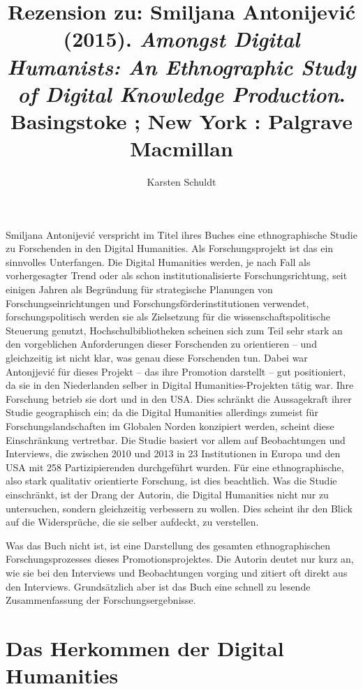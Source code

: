\documentclass[a4paper,
fontsize=11pt,
oneside,
numbers=noperiodatend,
parskip=half-,
bibliography=totoc,
final
]{scrartcl}
\title{\LARGE{Rezension zu: Smiljana Antonijević (2015). \emph{Amongst Digital Humanists: An Ethnographic Study of Digital Knowledge Production}. Basingstoke ; New York : Palgrave Macmillan}} %
\author{Karsten Schuldt} %
\date{}
\begin{document}
\maketitle
\thispagestyle{fancyplain} 


Smiljana Antonijević verspricht im Titel ihres Buches eine
ethnographische Studie zu Forschenden in den Digital Humanities. Als
Forschungsprojekt ist das ein sinnvolles Unterfangen. Die Digital
Humanities werden, je nach Fall als vorhergesagter Trend oder als schon
institutionalisierte Forschungsrichtung, seit einigen Jahren als
Begründung für strategische Planungen von Forschungseinrichtungen und
Forschungsförderinstitutionen verwendet, forschungspolitisch werden sie
als Zielsetzung für die wissenschaftspolitische Steuerung genutzt,
Hochschulbibliotheken scheinen sich zum Teil sehr stark an den
vorgeblichen Anforderungen dieser Forschenden zu orientieren -- und
gleichzeitig ist nicht klar, was genau diese Forschenden tun. Dabei war
Antonjjević für dieses Projekt -- das ihre Promotion darstellt -- gut
positioniert, da sie in den Niederlanden selber in Digital
Humanities-Projekten tätig war. Ihre Forschung betrieb sie dort und in
den USA. Dies schränkt die Aussagekraft ihrer Studie geographisch ein;
da die Digital Humanities allerdings zumeist für Forschungslandschaften
im Globalen Norden konzipiert werden, scheint diese Einschränkung
vertretbar. Die Studie basiert vor allem auf Beobachtungen und
Interviews, die zwischen 2010 und 2013 in 23 Institutionen in Europa und
den USA mit 258 Partizipierenden durchgeführt wurden. Für eine
ethnographische, also stark qualitativ orientierte Forschung, ist dies
beachtlich. Was die Studie einschränkt, ist der Drang der Autorin, die
Digital Humanities nicht nur zu untersuchen, sondern gleichzeitig
verbessern zu wollen. Dies scheint ihr den Blick auf die Widersprüche,
die sie selber aufdeckt, zu verstellen.

Was das Buch nicht ist, ist eine Darstellung des gesamten
ethnographischen Forschungsprozesses dieses Promotionsprojektes. Die
Autorin deutet nur kurz an, wie sie bei den Interviews und Beobachtungen
vorging und zitiert oft direkt aus den Interviews. Grundsätzlich aber
ist das Buch eine schnell zu lesende Zusammenfassung der
Forschungsergebnisse.

\section*{Das Herkommen der Digital
Humanities}\label{das-herkommen-der-digital-humanities}
\end{document}

